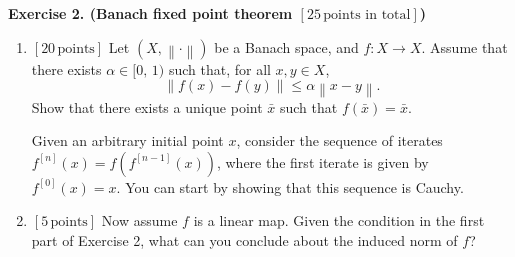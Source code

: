 \documentclass[fleqn, 10.5pt, a4paper]{article}
\theoremstyle{definition}
\numberwithin{equation}{section}
\begin{document}
\clearpage
{\bf Exercise 2. (Banach fixed point theorem  {\bf$[25\, \text{points in total}]$})}
\begin{enumerate}
\item {\bf$[20\, \text{points}]$} Let $\left(X, \left\lVert\cdot\right\rVert\right)$ be a Banach space, and $f:X\rightarrow X$. Assume that there exists $\alpha\in[0,\, 1)$ such that, for all $x,y\in X$,
\begin{displaymath}
\left\lVert f(x) - f(y) \right\rVert
\leq
\alpha
\left\lVert x - y \right\rVert.
\end{displaymath}
Show that there exists a unique point $\bar{x}$ such that $f(\bar{x}) = \bar{x}$.

Given an arbitrary initial point $x$,
consider the sequence of iterates 
$f^{[n]}(x) = f(f^{[n-1]}(x))$, where the first iterate is given by $f^{[0]}(x)=x$. You can start by showing that this sequence is Cauchy.

\item {\bf$[5\, \text{points}]$} Now assume $f$ is a linear map. Given the condition in the first part of Exercise 2, what can you conclude about the induced norm of $f$?

\end{enumerate}
\end{document}
